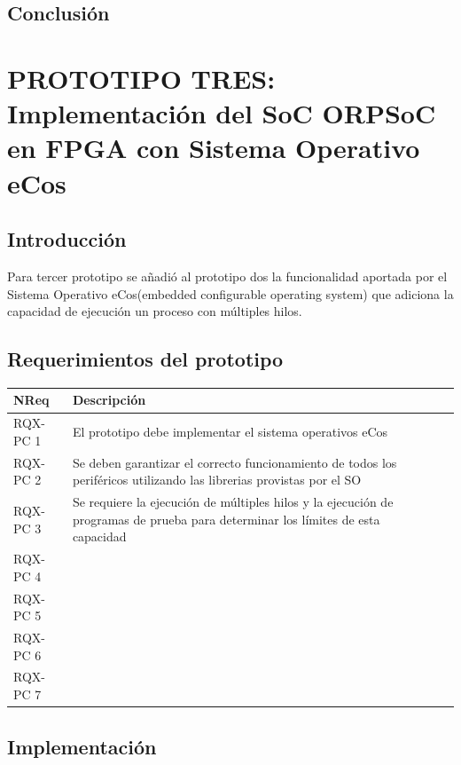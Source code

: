 	
		\subsection{Conclusión}

\newpage

	\section{PROTOTIPO TRES: Implementación del SoC ORPSoC en FPGA con Sistema Operativo eCos}
		\subsection{Introducción}
		Para tercer prototipo se añadió al prototipo dos la funcionalidad aportada por el Sistema Operativo eCos(embedded configurable operating system) que
		adiciona la capacidad de ejecución un proceso con múltiples hilos. 

		\subsection{Requerimientos del prototipo}

		\begin{table}[h!]
		\centering		
		\begin{tabular}{ p{2.5cm} p{8cm} p{3cm} }
		\hline 
		\rowcolor[gray]{0.8} N\textordmasculine Req & Descripción\\
		\hline 
		RQX-PC 1 & El prototipo debe implementar el sistema operativos eCos\\ 
		\hline 
		RQX-PC 2 & Se deben garantizar el correcto funcionamiento de todos los periféricos utilizando las librerias provistas por el SO\\ 
		\hline 
		RQX-PC 3 & Se requiere la ejecución de múltiples hilos y la ejecución de programas de prueba para determinar los límites de esta capacidad \\ 
		\hline
		RQX-PC 4 & \\
		\hline
		RQX-PC 5 & \\
		\hline
		RQX-PC 6 & \\
		\hline
		RQX-PC 7 & \\
		\hline		
		\end{tabular}
		\end{table}
		
		
		\subsection{Implementación}
		
